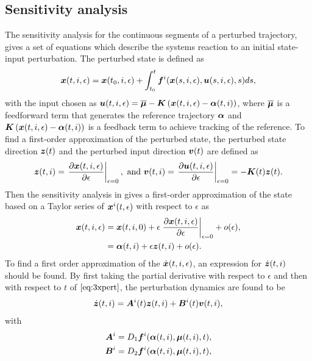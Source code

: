 \documentclass[../DC2017114Bouma.tex]{subfiles}
\begin{document}
\subsection{Sensitivity analysis}
The sensitivity analysis for the continuous segments of a perturbed trajectory, gives a set of equations which describe the systems reaction to an initial state-input perturbation. The perturbed state is defined as
\begin{align}
{\boldsymbol{x}}(t,i,\epsilon) = {\boldsymbol{x}}(t_0,i,\epsilon) + \int_{t_0}^{t}{\boldsymbol{f}}^i({\boldsymbol{x}}(s,i,\epsilon),{\boldsymbol{u}}(s,i,\epsilon),s)ds,\label{eq:3xpert}
\end{align}
with the input chosen as ${\boldsymbol{u}}(t,i,\epsilon) = \overline{\boldsymbol{\mu}} - {\boldsymbol{K}}\left({\boldsymbol{x}}(t,i,\epsilon)-\boldsymbol{\alpha}(t,i)\right)$, where $\overline{\boldsymbol{\mu}}$ is a feedforward term that generates the reference trajectory $\boldsymbol{\alpha}$ and ${\boldsymbol{K}}\left({\boldsymbol{x}}(t,i,\epsilon)-\boldsymbol{\alpha}(t,i)\right)$ is a feedback term to achieve tracking of the reference. To find a first-order approximation of the perturbed state, the perturbed state direction ${\boldsymbol{z}}(t)$ and the perturbed input direction ${\boldsymbol{v}}(t)$ are defined as
\begin{align}
{\boldsymbol{z}}(t,i) = \left.\frac{\partial{\boldsymbol{x}}(t,i,\epsilon)}{\partial\epsilon}\right|_{\epsilon=0},\text{ and } {\boldsymbol{v}}(t,i) = \left.\frac{\partial{\boldsymbol{u}}(t,i,\epsilon)}{\partial\epsilon}\right|_{\epsilon=0}=-{\boldsymbol{K}}(t){\boldsymbol{z}}(t).
\end{align}
Then the sensitivity analysis in \cite{Khalil1996} gives a first-order approximation of the state based on a Taylor series of ${\boldsymbol{x}}^i(t,\epsilon)$ with respect to $\epsilon$ as
\begin{align}
{\boldsymbol{x}}(t,i,\epsilon) &= {\boldsymbol{x}}(t,i,0) + \epsilon\left.\frac{\partial{\boldsymbol{x}}(t,i,\epsilon)}{\partial\epsilon}\right|_{\epsilon=0} + o(\epsilon),\label{eq:3taylor}\\
&= \boldsymbol{\alpha}(t,i) + \epsilon{\boldsymbol{z}}(t,i) + o(\epsilon).
\end{align}
To find a first order approximation of the $\dot{{\boldsymbol{x}}}(t,i,\epsilon)$, an expression for $\dot{{\boldsymbol{z}}}(t,i)$ should be found. By first taking the partial derivative with respect to $\epsilon$ and then with respect to $t$ of $\eqref{eq:3xpert}$, the perturbation dynamics are found to be
\begin{align}
\dot{{\boldsymbol{z}}}(t,i) = {\boldsymbol{A}}^i(t){\boldsymbol{z}}(t,i) +{\boldsymbol{B}}^i(t){\boldsymbol{v}}(t,i),
\end{align}
with
\begin{align}
{\boldsymbol{A}}^i &= D_1{\boldsymbol{f}}^i(\boldsymbol{\alpha}(t,i),\boldsymbol{\mu}(t,i),t),\\
{\boldsymbol{B}}^i &= D_2{\boldsymbol{f}}^i(\boldsymbol{\alpha}(t,i),\boldsymbol{\mu}(t,i),t),
\end{align}
\end{document}
